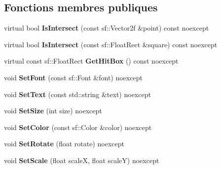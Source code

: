 \subsection*{Fonctions membres publiques}
\begin{DoxyCompactItemize}
\item 
\mbox{\label{classmy_1_1TextObject_affb75169f05260a87266c07dde14ee5a}} 
virtual bool {\bfseries Is\+Intersect} (const sf\+::\+Vector2f \&point) const noexcept
\item 
\mbox{\label{classmy_1_1TextObject_a26eda23e4fec449c8f402cf2521135fd}} 
virtual bool {\bfseries Is\+Intersect} (const sf\+::\+Float\+Rect \&square) const noexcept
\item 
\mbox{\label{classmy_1_1TextObject_aa297b3eab77e5a331eec8c7d641804b3}} 
virtual const sf\+::\+Float\+Rect {\bfseries Get\+Hit\+Box} () const noexcept
\item 
\mbox{\label{classmy_1_1TextObject_af4e932250fe1ea36d747b552ebd7671b}} 
void {\bfseries Set\+Font} (const sf\+::\+Font \&font) noexcept
\item 
\mbox{\label{classmy_1_1TextObject_a8551ba9793ef0c670549c1bc03158727}} 
void {\bfseries Set\+Text} (const std\+::string \&text) noexcept
\item 
\mbox{\label{classmy_1_1TextObject_a7f1bd59113e2d200c3d5384e78d6fcc0}} 
void {\bfseries Set\+Size} (int size) noexcept
\item 
\mbox{\label{classmy_1_1TextObject_a0e5ecb2bb4069f183fc84d6912a91c87}} 
void {\bfseries Set\+Color} (const sf\+::\+Color \&color) noexcept
\item 
\mbox{\label{classmy_1_1TextObject_a1e5d9ee2e21e5ad6282f559da6ac6097}} 
void {\bfseries Set\+Rotate} (float rotate) noexcept
\item 
\mbox{\label{classmy_1_1TextObject_a86747805eb38d71b850f620d7ccce3f0}} 
void {\bfseries Set\+Scale} (float scaleX, float scaleY) noexcept
\item 

\end{DoxyCompactItemize}
